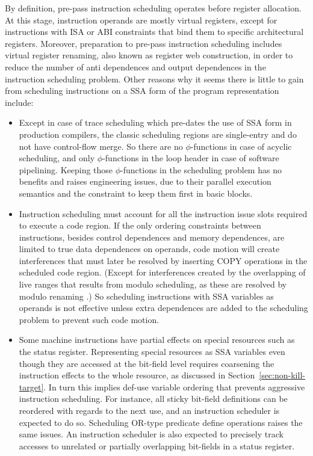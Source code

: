 By definition, pre-pass instruction scheduling operates before register
allocation. At this stage, instruction operands are mostly virtual registers,
except for instructions with ISA or ABI constraints that bind them to specific
architectural registers. Moreover, preparation to pre-pass instruction
scheduling includes virtual register renaming, also known as register web
construction, in order to reduce the number of anti dependences and output
dependences in the instruction scheduling problem. Other reasons why it seems
there is little to gain from scheduling instructions on a SSA form of the program
representation include: \begin{itemize}

\item Except in case of trace scheduling which pre-dates the use of SSA form in
production compilers, the classic scheduling regions are single-entry and do not
have control-flow merge. So there are no $\phi$-functions in case of acyclic
scheduling, and only $\phi$-functions in the loop header in case of software
pipelining. Keeping those $\phi$-functions in the scheduling problem has no
benefits and raises engineering issues, due to their parallel execution
semantics and the constraint to keep them first in basic blocks.

\item Instruction scheduling must account for all the instruction issue slots
required to execute a code region. If the only ordering constraints between
instructions, besides control dependences and memory dependences, are limited to
true data dependences on operands, code motion will create interferences that
must later be resolved by inserting COPY operations in the scheduled code
region. (Except for interferences created by the overlapping of live ranges
that results from modulo scheduling, as these are resolved by modulo renaming
\cite{Lam:1988:PLDI}.) So scheduling instructions with SSA variables as operands
is not effective unless extra dependences are added to the scheduling problem to
prevent such code motion. 

\item Some machine instructions have partial effects on special resources such
as the status register. Representing special resources as SSA variables even
though they are accessed at the bit-field level requires coarsening the
instruction effects to the whole resource, as discussed in
Section~\ref{sec:non-kill-target}. In turn this implies def-use variable
ordering that prevents aggressive instruction scheduling. For instance, all
{sticky} bit-field definitions can be reordered with regards to the next use,
and an instruction scheduler is expected to do so. Scheduling OR-type predicate
define operations \cite{Schlansker:1999:PLDI} raises the same issues.  An
instruction scheduler is also expected to precisely track accesses to unrelated
or partially overlapping bit-fields in a status register.


\end{itemize}
